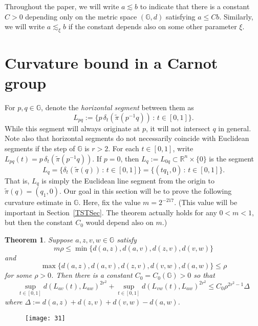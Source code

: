 \documentclass[11pt]{amsart}
\newtheorem{theorem}{Theorem}
\theoremstyle{definition}
\numberwithin{theorem}{section} \numberwithin{equation}{section}
\begin{document}
Throughout the paper, we will write $a \lesssim b$
to indicate that there is a constant $C>0$ depending only on the metric space $(\mathbb{G},d)$
satisfying $a \leq Cb$.
Similarly, we will write $a \lesssim_{\xi} b$ if the constant depends also on some other parameter $\xi$.









\section{Curvature bound in a Carnot group}
\label{curvatureSec}

For $p,q \in \mathbb{G}$, denote the \emph{horizontal segment} between them as
$$
L_{pq} := \{ p \, \delta_t(\tilde{\pi}( p^{-1} q)) \, : \, t \in [0,1] \}.
$$
While this segment will always originate at $p$,
it will not intersect $q$ in general.
Note also that horizontal segments do not necessarily coincide with 
Euclidean segments if the step of $\mathbb{G}$ is $r > 2$.
For each $t \in [0,1]$, write $L_{pq}(t) = p \, \delta_t(\tilde{\pi}( p^{-1} q))$.
If $p=0$, then $L_q := L_{0q} \subset \mathbb{R}^n \times \{0\}$ is the segment
$$
L_q = \{ \delta_t(\tilde{\pi}(q)) \, : \, t \in [0,1] \} = \{ (tq_1,0) \, : \, t \in [0,1] \}.
$$
That is, $L_q$ is simply the Euclidean line segment from the origin to $\tilde{\pi}(q) = (q_1,0)$.
Our goal in this section will be to prove the following curvature estimate in $\mathbb{G}$.
Here, fix the value $m = 2^{-217}$.
(This value will be important in Section~\ref{TSTSec}.
The theorem actually holds for any $0 < m < 1$, but then the constant $C_0$ would depend also on $m$.)


\begin{theorem}
\label{Goal}
Suppose $a,z,v,w \in \mathbb{G}$ satisfy
$$
m \rho \leq \min \{ d(a,z), d(a,v), d(z,v), d(v,w) \}
$$
and
$$
\max \{ d(a,z), d(a,v), d(z,v), d(v,w), d(a,w) \} \leq \rho
$$
for some $\rho > 0$.
Then there is a constant $C_0 = C_0(\mathbb{G}) > 0$ so that
$$
\sup_{t \in [0,1]} d(L_{av}(t),L_{aw})^{2r^2} + \sup_{t \in [0,1]} d(L_{vw}(t),L_{aw})^{2r^2}
\leq C_0 \rho^{2r^2-1} \Delta
$$
where $\Delta := d(a,z) + d(z,v) + d(v,w) - d(a,w)$.
\end{theorem}
\begin{figure}[H]
\centering
\texttt{[image: 31]}
\caption{}
\label{fig1}
\end{figure}
\end{document}
